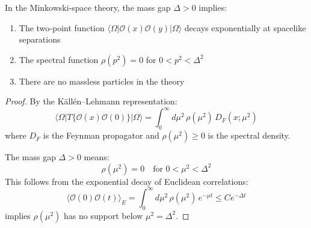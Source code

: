 \begin{theorem}
In the Minkowski-space theory, the mass gap $\Delta > 0$ implies:
\begin{enumerate}[label=(\roman*)]
\item The two-point function $\langle \Omega | \mathcal{O}(x) \mathcal{O}(y) | \Omega \rangle$ 
decays exponentially at spacelike separations
\item The spectral function $\rho(p^2) = 0$ for $0 < p^2 < \Delta^2$
\item There are no massless particles in the theory
\end{enumerate}
\end{theorem}

\begin{proof}
By the K\"all\'en--Lehmann representation:
\[
\langle \Omega | T\{\mathcal{O}(x) \mathcal{O}(0)\} | \Omega \rangle 
= \int_0^\infty d\mu^2 \, \rho(\mu^2) \, D_F(x; \mu^2)
\]
where $D_F$ is the Feynman propagator and $\rho(\mu^2) \geq 0$ is the spectral density.

The mass gap $\Delta > 0$ means:
\[
\rho(\mu^2) = 0 \quad \text{for } 0 < \mu^2 < \Delta^2
\]
This follows from the exponential decay of Euclidean correlations:
\[
\langle \mathcal{O}(0) \mathcal{O}(t) \rangle_E = \int_0^\infty d\mu^2 \, \rho(\mu^2) \, e^{-\mu t} 
\leq C e^{-\Delta t}
\]
implies $\rho(\mu^2)$ has no support below $\mu^2 = \Delta^2$.
\end{proof}









